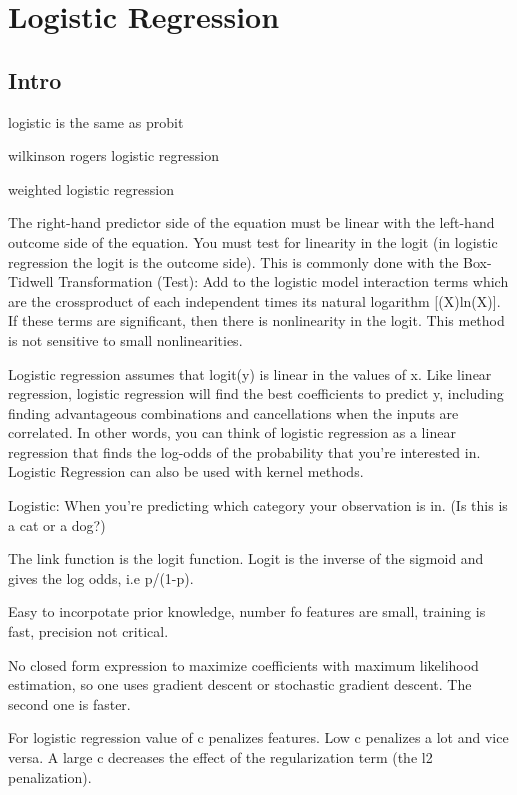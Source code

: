 \documentclass[]{book}
\theoremstyle{definition}
\theoremstyle{definition}
\theoremstyle{definition}
\theoremstyle{remark}
\begin{document}
\section{Logistic Regression}\label{logistic-regression}

\subsection{Intro}\label{intro-2}

logistic is the same as probit

wilkinson rogers logistic regression

weighted logistic regression

The right-hand predictor side of the equation must be linear with the
left-hand outcome side of the equation. You must test for linearity in
the logit (in logistic regression the logit is the outcome side). This
is commonly done with the Box-Tidwell Transformation (Test): Add to the
logistic model interaction terms which are the crossproduct of each
independent times its natural logarithm {[}(X)ln(X){]}. If these terms
are significant, then there is nonlinearity in the logit. This method is
not sensitive to small nonlinearities.

Logistic regression assumes that logit(y) is linear in the values of x.
Like linear regression, logistic regression will find the best
coefficients to predict y, including finding advantageous combinations
and cancellations when the inputs are correlated. In other words, you
can think of logistic regression as a linear regression that finds the
log-odds of the probability that you're interested in. Logistic
Regression can also be used with kernel methods.

Logistic: When you're predicting which category your observation is in.
(Is this is a cat or a dog?)

The link function is the logit function. Logit is the inverse of the
sigmoid and gives the log odds, i.e p/(1-p).

Easy to incorpotate prior knowledge, number fo features are small,
training is fast, precision not critical.

No closed form expression to maximize coefficients with maximum
likelihood estimation, so one uses gradient descent or stochastic
gradient descent. The second one is faster.

For logistic regression value of c penalizes features. Low c penalizes a
lot and vice versa. A large c decreases the effect of the regularization
term (the l2 penalization).
\end{document}
